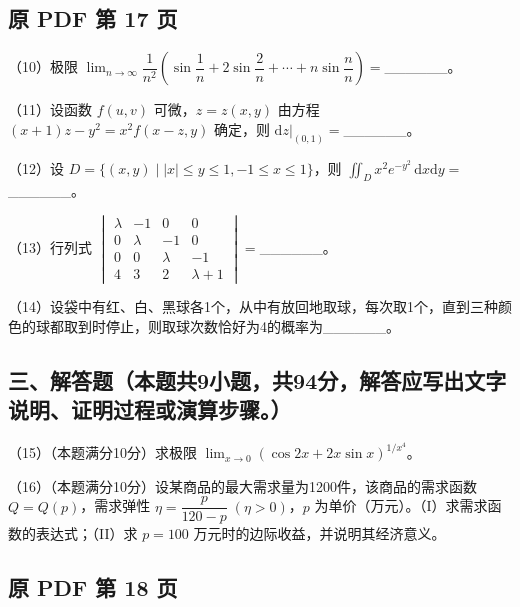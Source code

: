 \documentclass[UTF8,12pt]{ctexart}
\begin{document}
\clearpage

\subsection*{原 PDF 第 17 页}

（10）极限 \(\displaystyle \lim_{n\to\infty}\dfrac{\displaystyle 1}{\displaystyle n^2}(\sin\dfrac{\displaystyle 1}{\displaystyle n}+2\sin\dfrac{\displaystyle 2}{\displaystyle n}+\cdots+n\sin\dfrac{\displaystyle n}{\displaystyle n})=\)\_\_\_\_\_\_。


（11）设函数 \(\displaystyle f(u,\allowbreak v)\) 可微，\(\displaystyle z=z(x,\allowbreak y)\) 由方程 \(\displaystyle (x+1)z-y^2=x^2f(x-z,\allowbreak y)\) 确定，则 \(\displaystyle \left.\mathrm dz\right|_{(0,\allowbreak 1)}=\)\_\_\_\_\_\_。


（12）设 \(\displaystyle D=\{(x,\allowbreak y)\mid|x|\le y\le1,\allowbreak -1\le x\le1\}\)，则 \(\displaystyle \iint_Dx^2e^{-y^2}\,\mathrm dx\mathrm dy=\)\_\_\_\_\_\_。


（13）行列式 \(\displaystyle \begin{vmatrix}\lambda&-1&0&0\\0&\lambda&-1&0\\0&0&\lambda&-1\\4&3&2&\lambda+1\end{vmatrix}=\)\_\_\_\_\_\_。


（14）设袋中有红、白、黑球各1个，从中有放回地取球，每次取1个，直到三种颜色的球都取到时停止，则取球次数恰好为4的概率为\_\_\_\_\_\_。


\subsection*{三、解答题（本题共9小题，共94分，解答应写出文字说明、证明过程或演算步骤。）}

（15）（本题满分10分）求极限 \(\displaystyle \lim_{x\to0}(\cos2x+2x\sin x)^{1/x^4}\)。


（16）（本题满分10分）设某商品的最大需求量为1200件，该商品的需求函数 \(\displaystyle Q=Q(p)\)，需求弹性 \(\displaystyle \eta=\dfrac{\displaystyle p}{\displaystyle 120-p}\;(\eta>0)\)，\(\displaystyle p\) 为单价（万元）。（I）求需求函数的表达式；（II）求 \(\displaystyle p=100\) 万元时的边际收益，并说明其经济意义。


\clearpage

\subsection*{原 PDF 第 18 页}
\end{document}
